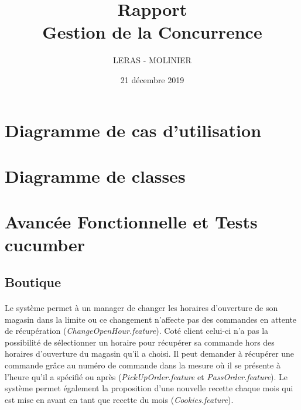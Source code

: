 \documentclass[12pt,oneside,a4paper]{article}
\begin{document}
\title{%
  Rapport \\Gestion de la Concurrence}

\author{LERAS - MOLINIER}
\date{21 décembre 2019}
\maketitle
\newpage

\tableofcontents
\newpage

\section{Diagramme de cas d'utilisation}
\paragraph{}

\newpage
\section{Diagramme de classes}
\paragraph{}

\newpage

\section{Avancée Fonctionnelle et Tests cucumber }

\subsection{Boutique}
\paragraph{}
Le système permet à un manager de changer les horaires d'ouverture de son magasin dans la 
limite ou ce changement n'affecte pas des commandes en attente de récupération
(\textit{ChangeOpenHour.feature}). Coté client celui-ci n'a pas la possibilité de sélectionner un horaire
pour récupérer sa commande hors des horaires d'ouverture du magasin qu'il a choisi. Il peut demander à récupérer
une commande grâce au numéro de commande dans la mesure où il se présente à l'heure qu'il a spécifié ou après
(\textit{PickUpOrder.feature} et \textit{PassOrder.feature}). Le système permet également 
la proposition d'une nouvelle recette chaque mois qui est mise en avant en tant que recette 
du mois (\textit{Cookies.feature}).
\end{document}
